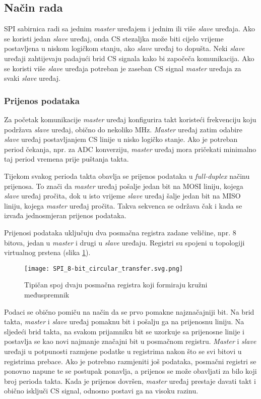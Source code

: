 \subsection{Način rada}

SPI sabirnica radi sa jednim \textit{master} uređajem i jednim ili više \textit{slave} uređaja. Ako se koristi jedan \textit{slave} uređaj, onda CS stezaljka može biti cijelo vrijeme postavljena u niskom logičkom stanju, ako \textit{slave} uređaj to dopušta. Neki \textit{slave} uređaji zahtijevaju padajući brid CS signala kako bi započeča komunikacija. Ako se koristi više \textit{slave} uređaja potreban je zaseban CS signal \textit{master} uređaja za svaki \textit{slave} uređaj.

\subsubsection{Prijenos podataka}

Za početak komunikacije \textit{master} uređaj konfigurira takt koristeći frekvenciju koju podržava \textit{slave} uređaj, obično do nekoliko \si{MHz}. \textit{Master} uređaj zatim odabire \textit{slave} uređaj postavljanjem CS linije u nisko logičko stanje. Ako je potreban period čekanja, npr. za ADC konverziju, \textit{master} uređaj mora pričekati minimalno taj period vremena prije puštanja takta.

Tijekom svakog perioda takta obavlja se prijenos podataka u \textit{full-duplex} načinu prijenosa. To znači da \textit{master} uređaj pošalje jedan bit na MOSI liniju, kojega \textit{slave} uređaj pročita, dok u isto vrijeme \textit{slave} uređaj šalje jedan bit na MISO liniju, kojega \textit{master} uređaj pročita. Takva sekvenca se održava čak i kada se izvađa jednosmjeran prijenos podataka.

Prijenosi podataka uključuju dva posmačna registra zadane veličine, npr. 8 bitova, jedan u \textit{master} i drugi u \textit{slave} uređaju. Registri su spojeni u topologiji virtualnog prstena (slika \ref{fig:spi_circular_transfer}).
\begin{figure}[H]
	\centering
	\texttt{[image: SPI\_8-bit\_circular\_transfer.svg.png]}
	\caption{Tipičan spoj dvaju posmačna registra koji formiraju kružni međuspremnik \cite{spi_wikipedia}}
	\label{fig:spi_circular_transfer}
\end{figure}
Podaci se obično pomiču na način da se prvo pomakne najznačajniji bit. Na brid takta, \textit{master} i \textit{slave} uređaj pomaknu bit i pošalju ga na prijenosnu liniju. Na sljedeći brid takta, na svakom prijamniku bit se uzorkuje sa prijenosne linije i postavlja se kao novi najmanje značajni bit u posmačnom registru. \textit{Master} i \textit{slave} uređaji u potpunosti razmjene podatke u registrima nakon što se svi bitovi u registrima prebace. Ako je potrebno razmjeniti još podataka, posmačni registri se ponovno napune te se postupak ponavlja, a prijenos se može obavljati za bilo koji broj perioda takta. Kada je prijenos dovršen, \textit{master} uređaj prestaje davati takt i obično isključi CS signal, odnosno postavi ga na visoku razinu.

